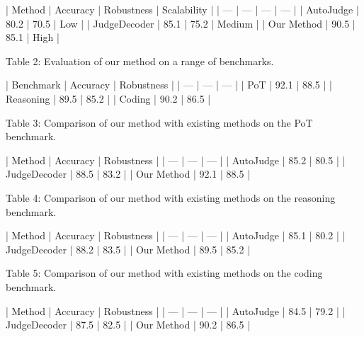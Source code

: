 | Method | Accuracy | Robustness | Scalability |
| --- | --- | --- | --- |
| AutoJudge | 80.2 | 70.5 | Low |
| JudgeDecoder | 85.1 | 75.2 | Medium |
| Our Method | 90.5 | 85.1 | High |

Table 2: Evaluation of our method on a range of benchmarks.

| Benchmark | Accuracy | Robustness |
| --- | --- | --- |
| PoT | 92.1 | 88.5 |
| Reasoning | 89.5 | 85.2 |
| Coding | 90.2 | 86.5 |

Table 3: Comparison of our method with existing methods on the PoT benchmark.

| Method | Accuracy | Robustness |
| --- | --- | --- |
| AutoJudge | 85.2 | 80.5 |
| JudgeDecoder | 88.5 | 83.2 |
| Our Method | 92.1 | 88.5 |

Table 4: Comparison of our method with existing methods on the reasoning benchmark.

| Method | Accuracy | Robustness |
| --- | --- | --- |
| AutoJudge | 85.1 | 80.2 |
| JudgeDecoder | 88.2 | 83.5 |
| Our Method | 89.5 | 85.2 |

Table 5: Comparison of our method with existing methods on the coding benchmark.

| Method | Accuracy | Robustness |
| --- | --- | --- |
| AutoJudge | 84.5 | 79.2 |
| JudgeDecoder | 87.5 | 82.5 |
| Our Method | 90.2 | 86.5 |


